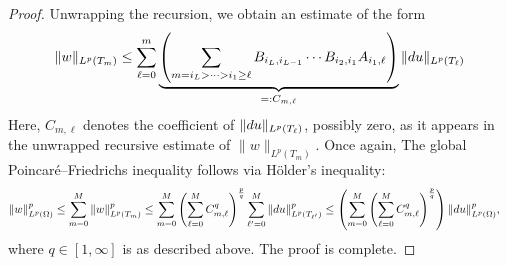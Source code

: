 \documentclass[10pt,a4paper]{article}
\begin{document}
\begin{proof}    
    Unwrapping the recursion, we obtain an estimate of the form 
    \begin{align*}
        \| w \|_{L^{p}(T_{m})} 
        \leq 
        \sum_{\ell = 0}^{m}
        \underbrace{ 
            \left( 
                \sum_{ m = i_L > \dots > i_1 \geq \ell }
                B_{i_{L},i_{L-1}} \cdots B_{i_{2},i_{1}} A_{i_{1},\ell}
            \right)
        }_{ =: C_{m,\ell} }
        \| d u \|_{L^{p}(T_{\ell})} 
    \end{align*}
    Here, $C_{m,\ell}$ denotes the coefficient of $\| d u \|_{L^{p}(T_{\ell})}$, possibly zero, 
    as it appears in the unwrapped recursive estimate of $\| w \|_{L^{p}(T_{m})}$. 
    Once again, The global Poincar\'e--Friedrichs inequality follows via H\"older's inequality:
    \begin{align*}
        \| w \|_{L^{p}(\Omega)}^{p}
        &
        \leq 
        \sum_{m=0}^{M}
        \| w \|_{L^{p}(T_{m})}^{p}
        \leq 
        \sum_{m=0}^{M}
        \left( \sum_{\ell=0}^{M} C_{m,\ell}^{q} \right)^{\frac p q}
        \sum_{\ell'=0}^{M} \| d u \|_{L^{p}(T_{\ell'})}^{p} 
        \leq 
        \left(
            \sum_{m=0}^{M}
            \left( \sum_{\ell=0}^{M} C_{m,\ell}^{q} \right)^{\frac p q}
        \right)
        \| d u \|_{L^{p}(\Omega)}^{p} 
        ,
    \end{align*}
    where $q \in [1,\infty]$ is as described above. The proof is complete. 
\end{proof}    
    
\end{document}
